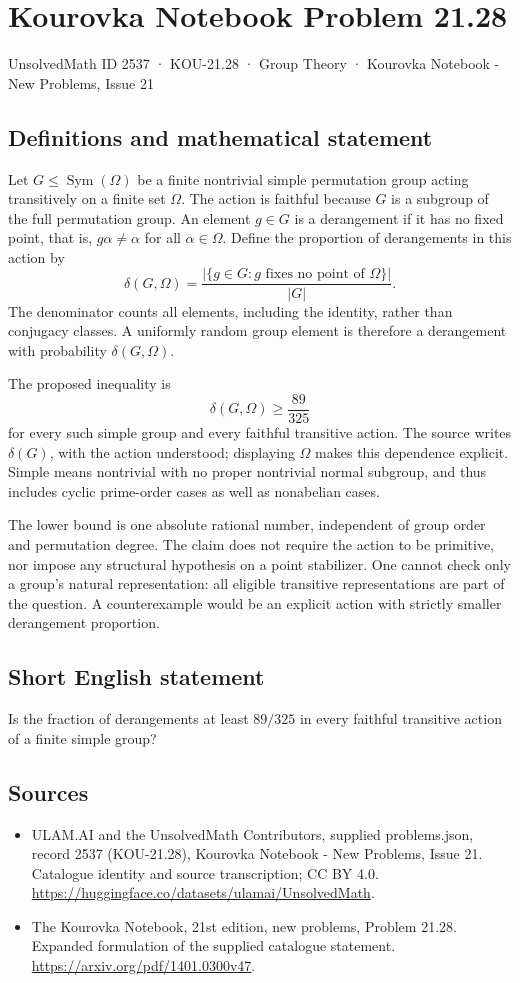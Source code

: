 \documentclass[11pt,a4paper]{article}
\begin{document}
\section*{Kourovka Notebook Problem 21.28}\label{2537}
{\small UnsolvedMath ID 2537 · KOU-21.28 · Group Theory · Kourovka Notebook - New Problems, Issue 21}
\subsection{Definitions and mathematical statement}
Let $G\le\operatorname{Sym}(\Omega)$ be a finite nontrivial simple
permutation group acting transitively on a finite set $\Omega$.
The action is faithful because $G$ is a subgroup of the full permutation
group. An element $g\in G$ is a derangement if it has no fixed point,
that is, $g\alpha\ne\alpha$ for all $\alpha\in\Omega$.
Define the proportion of derangements in this action by
\[
 \delta(G,\Omega)=\frac{|\{g\in G:g\text{ fixes no point of }\Omega\}|}{|G|}.
\]
The denominator counts all elements, including the identity, rather than
conjugacy classes. A uniformly random group element is therefore a
derangement with probability $\delta(G,\Omega)$.

The proposed inequality is
\[
 \delta(G,\Omega)\ge\frac{89}{325}
\]
for every such simple group and every faithful transitive action.
The source writes $\delta(G)$, with the action understood; displaying
$\Omega$ makes this dependence explicit. Simple means nontrivial with
no proper nontrivial normal subgroup, and thus includes cyclic prime-order
cases as well as nonabelian cases.

The lower bound is one absolute rational number, independent of group
order and permutation degree. The claim does not require the action to
be primitive, nor impose any structural hypothesis on a point stabilizer.
One cannot check only a group's natural representation: all eligible
transitive representations are part of the question. A counterexample
would be an explicit action with strictly smaller derangement proportion.
\subsection{Short English statement}
Is the fraction of derangements at least $89/325$ in every faithful transitive action of a finite simple group?
\subsection{Sources}
\begin{itemize}
\item[S1] ULAM.AI and the UnsolvedMath Contributors, supplied problems.json, record 2537 (KOU-21.28), Kourovka Notebook - New Problems, Issue 21. Catalogue identity and source transcription; CC BY 4.0.
\url{https://huggingface.co/datasets/ulamai/UnsolvedMath}.
\item[S2] The Kourovka Notebook, 21st edition, new problems, Problem 21.28. Expanded formulation of the supplied catalogue statement.
\url{https://arxiv.org/pdf/1401.0300v47}.
\end{itemize}
\end{document}
